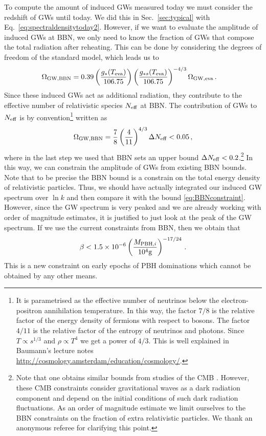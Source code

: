 \documentclass[a4paper,11pt]{article}
\numberwithin{equation}{section}
\begin{document}
To compute the amount of induced GWs measured today we must consider the redshift of GWs until today. We did this in Sec.~\ref{sec:typical} with Eq.~\eqref{eq:spectraldensitytoday2}. However, if we want to evaluate the amplitude of induced GWs at BBN, we only need to know the fraction of GWs that compose the total radiation after reheating. This can be done by considering the degrees of freedom of the standard model, which leads us to
\begin{align}\label{eq:spectraldensityBBN}
\Omega_{\rm GW,BBN}&=0.39\left(\frac{g_*(T_{\rm eva})}{106.75}\right)\left(\frac{g_{*s}(T_{\rm eva})}{106.75}\right)^{-4/3}\Omega_{\rm GW,\rm eva}\,.
\end{align}
Since these induced GWs act as additional radiation, they contribute to the effective number of relativistic species $N_{\rm eff}$ at BBN. The contribution of GWs to $N_{\rm eff}$ is by convention\footnote{It is parametrised as the effective number of neutrinos below the electron-positron annihilation temperature. In this way, the factor ${7}/{8}$ is the relative factor of the energy density of fermions with respect to bosons. The factor ${4}/{11}$ is the relative factor of the entropy of neutrinos and photons. Since $T\propto s^{1/3}$ and $\rho\propto T^4$ we get a power of $4/3$. This is well explained in Baumann's lecture notes \url{http://cosmology.amsterdam/education/cosmology/}.} written as \cite{Caprini:2018mtu}
\begin{align}\label{eq:BBNconstraint}
\Omega_{\rm GW,BBN}=\frac{7}{8}\left(\frac{4}{11}\right)^{4/3}\Delta N_{\rm eff}< 0.05\,,
\end{align}
where in the last step we used that BBN \cite{Cyburt:2004yc,Fields:2019pfx} sets an upper bound $\Delta N_{\rm eff}<0.2$.\footnote{Note that one obtains similar bounds from studies of the CMB \cite{Sendra:2012wh,Pagano:2015hma}. However, these CMB constraints consider gravitational waves as a dark radiation component and depend on the initial conditions of such dark radiation fluctuations. As an order of magnitude estimate we limit ourselves to the BBN constraints \cite{Cyburt:2004yc,Fields:2019pfx} on the fraction of extra relativistic particles. We thank an anonymous referee for clarifying this point.} In this way, we can constrain the amplitude of GWs from existing BBN bounds. Note that to be precise the BBN bound is a constrain on the total energy density of relativistic particles. Thus, we should have actually integrated our induced GW spectrum over $\ln k$ and then compare it with the bound \eqref{eq:BBNconstraint}. However, since the GW spectrum is very peaked and we are already working with order of magnitude estimates, it is justified to just look at the peak of the GW spectrum. If we use the current constraints from BBN, then we obtain that
\begin{align}
\beta< 1.5\times10^{-6}\left(\frac{M_{{\rm PBH},i}}{10^4{\rm g}}\right)^{-17/24}\,.
\end{align}
This is a new constraint on early epochs of PBH dominations which cannot be obtained by any other means.
\end{document}
